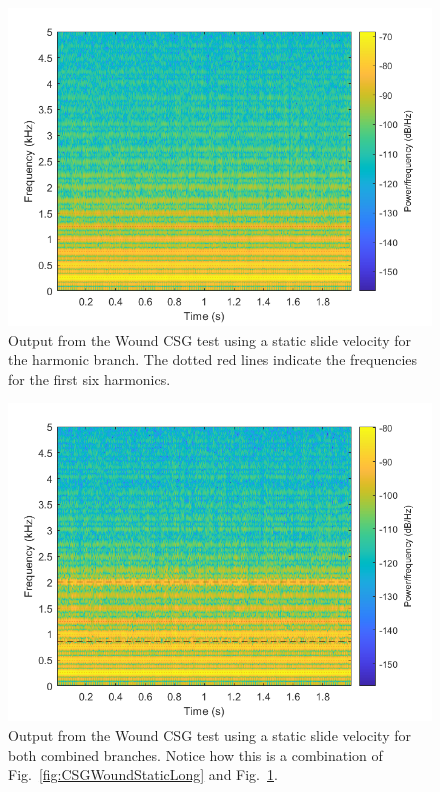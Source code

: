 \documentclass[../main.tex]{subfiles}
\begin{document}
\begin{figure}[t]
    \centering
    \includegraphics[scale=.60]{./images/plots/CSG_Wound_Static_Harm.png}
    \caption{Output from the Wound CSG test using a static slide velocity for the harmonic branch. The dotted red lines indicate the frequencies for the first six harmonics.}
    \label{fig:CSGWoundStaticHarm}
\end{figure}

\begin{figure}[b]
    \centering
    \includegraphics[scale=.60]{./images/plots/CSG_Wound_Static_Both.png}
    \caption{Output from the Wound CSG test using a static slide velocity for both combined branches. Notice how this is a combination of Fig.~\ref{fig:CSGWoundStaticLong} and Fig.~\ref{fig:CSGWoundStaticHarm}.}
    \label{fig:CSGWoundStaticBoth}
\end{figure}
\end{document}
